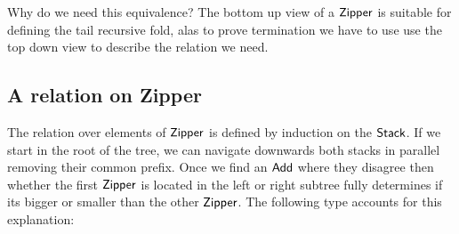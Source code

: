 \documentclass[sigplan,10pt,review]{acmart}
\newcommand{\AI}{\AgdaInductiveConstructor}
\newcommand{\AD}{\AgdaDatatype}
\begin{document}
Why do we need this equivalence? The bottom up view of a \ensuremath{\AD{Zipper}} is suitable
for defining the tail recursive fold, alas to prove termination we have to use
use the top down view to describe the relation we need.

\subsection{A relation on Zipper}

The relation over elements of \ensuremath{\AD{Zipper}} is defined by induction on the \ensuremath{\AD{Stack}}.
If we start in the root of the tree, we can navigate downwards both stacks in
parallel removing their common prefix. Once we find an \ensuremath{\AI{Add}} where they
disagree then whether the first \ensuremath{\AD{Zipper}} is located in the left or right
subtree fully determines if its bigger or smaller than the other \ensuremath{\AD{Zipper}}.
The following type accounts for this explanation:
\end{document}
